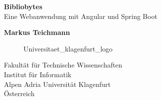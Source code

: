 \begin{titlepage}
    \begin{center}
        \vspace*{1cm}
        \Huge
        \textbf{Bibliobytes}\\
        \LARGE
        \vspace{0.5cm}
        Eine Webanwendung mit Angular und Spring Boot

        \vspace{1.5cm}
        \textbf{Markus Teichmann \vspace{-1.1cm} \\ \hspace{4.5cm} \footnotesize \footnotemark}

        \Large

        \vspace{3cm}

        \begin{figure}[htp]
            \centering
            {Universitaet_klagenfurt_logo}
        \end{figure}
        Fakultät für Technische Wissenschaften\\
        Institut für Informatik\\
        Alpen Adria Universität Klagenfurt\\
        Österreich\\
        \currentDate

    \end{center}
\end{titlepage}
